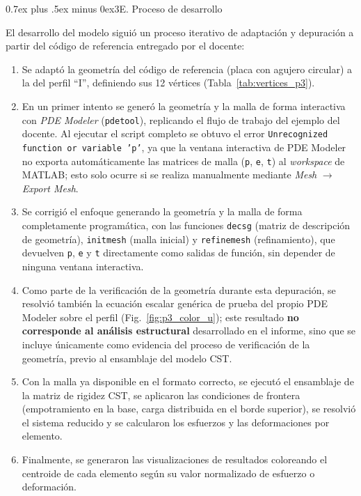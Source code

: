 \documentclass[conference]{IEEEtran}
\makeatletter
\def\subsection{\@startsection{subsection}{2}{\z@}{1.5ex plus 1.5ex minus 0.5ex}%
{0.7ex plus .5ex minus 0ex}{\normalfont\normalsize\bfseries}}%
\makeatother
\begin{document}
\subsection{3E. Proceso de desarrollo}

El desarrollo del modelo siguió un proceso iterativo de adaptación y depuración a partir del código de referencia entregado por el docente:

\begin{enumerate}
    \item Se adaptó la geometría del código de referencia (placa con agujero circular) a la del perfil ``I'', definiendo sus 12 vértices (Tabla~\ref{tab:vertices_p3}).
    \item En un primer intento se generó la geometría y la malla de forma interactiva con \textit{PDE Modeler} (\texttt{pdetool}), replicando el flujo de trabajo del ejemplo del docente. Al ejecutar el script completo se obtuvo el error \texttt{Unrecognized function or variable 'p'}, ya que la ventana interactiva de PDE Modeler no exporta automáticamente las matrices de malla (\texttt{p}, \texttt{e}, \texttt{t}) al \textit{workspace} de MATLAB; esto solo ocurre si se realiza manualmente mediante \textit{Mesh} $\rightarrow$ \textit{Export Mesh}.
    \item Se corrigió el enfoque generando la geometría y la malla de forma completamente programática, con las funciones \texttt{decsg} (matriz de descripción de geometría), \texttt{initmesh} (malla inicial) y \texttt{refinemesh} (refinamiento), que devuelven \texttt{p}, \texttt{e} y \texttt{t} directamente como salidas de función, sin depender de ninguna ventana interactiva.
    \item Como parte de la verificación de la geometría durante esta depuración, se resolvió también la ecuación escalar genérica de prueba del propio PDE Modeler sobre el perfil (Fig.~\ref{fig:p3_color_u}); este resultado \textbf{no corresponde al análisis estructural} desarrollado en el informe, sino que se incluye únicamente como evidencia del proceso de verificación de la geometría, previo al ensamblaje del modelo CST.
    \item Con la malla ya disponible en el formato correcto, se ejecutó el ensamblaje de la matriz de rigidez CST, se aplicaron las condiciones de frontera (empotramiento en la base, carga distribuida en el borde superior), se resolvió el sistema reducido y se calcularon los esfuerzos y las deformaciones por elemento.
    \item Finalmente, se generaron las visualizaciones de resultados coloreando el centroide de cada elemento según su valor normalizado de esfuerzo o deformación.
\end{enumerate}
\end{document}
